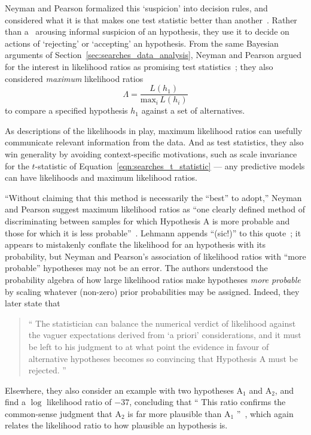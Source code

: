 Neyman and Pearson formalized this `suspicion' into decision rules,
and considered what it is that makes one test statistic better than
another~\cite{neymanpearson1928max, neymanpearson1933lemma}.
Rather than a \pvalue\ arousing informal suspicion of an hypothesis, they use it
to decide on actions of `rejecting' or `accepting' an hypothesis.
From the same Bayesian arguments of Section~\ref{sec:searches_data_analysis},
Neyman and Pearson argued for the interest in likelihood ratios as promising
test statistics~\cite{neymanpearson1928max};
they also considered \emph{maximum} likelihood ratios
\begin{equation}
\label{eqn:searches_max_like_ratio}
\Lambda =
\frac{L(h_1)}{\mathrm{max}_i\,L(h_i)}
\end{equation}
to compare a specified hypothesis $h_1$ against a set of alternatives.

As descriptions of the likelihoods in play, maximum likelihood ratios can
usefully communicate relevant information from the data.
And as test statistics, they also win generality by avoiding context-specific
motivations, such as scale invariance for the $t$-statistic of
Equation~\ref{eqn:searches_t_statistic} --- any predictive models can have
likelihoods and maximum likelihood ratios.

``Without claiming that this method is necessarily the ``best'' to adopt,''
Neyman and Pearson suggest maximum likelihood ratios as
``one clearly defined method of discriminating between samples for which
Hypothesis A is more probable and those for which it is less probable''~\cite{
neymanpearson1933lemma}.
Lehmann appends ``(sic!)'' to this quote~\cite{lehmann2011fisher};
it appears to mistakenly conflate the likelihood for an hypothesis with its
probability, but Neyman and Pearson's association of likelihood ratios with
``more probable'' hypotheses may not be an error.
The authors understood the probability algebra of how large likelihood ratios
make hypotheses \emph{more probable} by scaling whatever (non-zero) prior
probabilities may be assigned.
Indeed, they later state that
\begin{quote}
``%
The statistician can balance the numerical verdict of likelihood against the
vaguer expectations derived from `a priori' considerations, and it must be left
to his judgment to at what point the evidence in favour of alternative
hypotheses becomes so convincing that Hypothesis A must be rejected.%
''~\cite{neymanpearson1933lemma}
\end{quote}
Elsewhere, they also consider an example with two hypotheses $\mathrm{A}_1$
and $\mathrm{A}_2$, and find a $\log$ likelihood ratio of
$-37$, concluding that
``%
This ratio confirms the common-sense judgment that $\mathrm{A}_2$ is far more
plausible than $\mathrm{A}_1$%
''~\cite{neymanpearson1928max},
which again relates the likelihood ratio to how plausible an hypothesis is.

